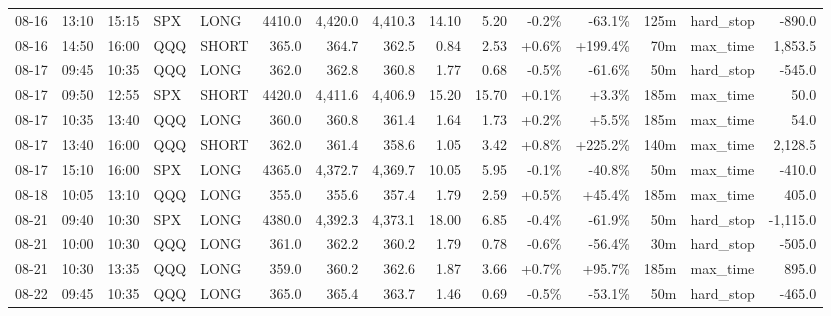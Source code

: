 \documentclass[11pt,a4paper,twoside]{article}
\begin{document}
\begin{landscape}
\begin{center}
\begin{longtable}{>{\color{txtmain}}l l l l l r r r r r r r r >{\color{txtmain}}l r}
08-16 & 13:10 & 15:15 & SPX & LONG & 4410.0 & 4,420.0 & 4,410.3 & 14.10 & 5.20 & \textcolor{lossred}{-0.2\%} & \textcolor{lossred}{-63.1\%} & 125m & hard\_stop & \textcolor{lossred}{-890.0} \\
08-16 & 14:50 & 16:00 & QQQ & SHORT & 365.0 & 364.7 & 362.5 & 0.84 & 2.53 & \textcolor{wingreen}{+0.6\%} & \textcolor{wingreen}{+199.4\%} & 70m & max\_time & \textcolor{wingreen}{1,853.5} \\
08-17 & 09:45 & 10:35 & QQQ & LONG & 362.0 & 362.8 & 360.8 & 1.77 & 0.68 & \textcolor{lossred}{-0.5\%} & \textcolor{lossred}{-61.6\%} & 50m & hard\_stop & \textcolor{lossred}{-545.0} \\
08-17 & 09:50 & 12:55 & SPX & SHORT & 4420.0 & 4,411.6 & 4,406.9 & 15.20 & 15.70 & \textcolor{wingreen}{+0.1\%} & \textcolor{wingreen}{+3.3\%} & 185m & max\_time & \textcolor{wingreen}{50.0} \\
08-17 & 10:35 & 13:40 & QQQ & LONG & 360.0 & 360.8 & 361.4 & 1.64 & 1.73 & \textcolor{wingreen}{+0.2\%} & \textcolor{wingreen}{+5.5\%} & 185m & max\_time & \textcolor{wingreen}{54.0} \\
08-17 & 13:40 & 16:00 & QQQ & SHORT & 362.0 & 361.4 & 358.6 & 1.05 & 3.42 & \textcolor{wingreen}{+0.8\%} & \textcolor{wingreen}{+225.2\%} & 140m & max\_time & \textcolor{wingreen}{2,128.5} \\
08-17 & 15:10 & 16:00 & SPX & LONG & 4365.0 & 4,372.7 & 4,369.7 & 10.05 & 5.95 & \textcolor{lossred}{-0.1\%} & \textcolor{lossred}{-40.8\%} & 50m & max\_time & \textcolor{lossred}{-410.0} \\
08-18 & 10:05 & 13:10 & QQQ & LONG & 355.0 & 355.6 & 357.4 & 1.79 & 2.59 & \textcolor{wingreen}{+0.5\%} & \textcolor{wingreen}{+45.4\%} & 185m & max\_time & \textcolor{wingreen}{405.0} \\
08-21 & 09:40 & 10:30 & SPX & LONG & 4380.0 & 4,392.3 & 4,373.1 & 18.00 & 6.85 & \textcolor{lossred}{-0.4\%} & \textcolor{lossred}{-61.9\%} & 50m & hard\_stop & \textcolor{lossred}{-1,115.0} \\
08-21 & 10:00 & 10:30 & QQQ & LONG & 361.0 & 362.2 & 360.2 & 1.79 & 0.78 & \textcolor{lossred}{-0.6\%} & \textcolor{lossred}{-56.4\%} & 30m & hard\_stop & \textcolor{lossred}{-505.0} \\
08-21 & 10:30 & 13:35 & QQQ & LONG & 359.0 & 360.2 & 362.6 & 1.87 & 3.66 & \textcolor{wingreen}{+0.7\%} & \textcolor{wingreen}{+95.7\%} & 185m & max\_time & \textcolor{wingreen}{895.0} \\
08-22 & 09:45 & 10:35 & QQQ & LONG & 365.0 & 365.4 & 363.7 & 1.46 & 0.69 & \textcolor{lossred}{-0.5\%} & \textcolor{lossred}{-53.1\%} & 50m & hard\_stop & \textcolor{lossred}{-465.0} \\

\end{longtable}
\end{center}
\end{landscape}
\end{document}
